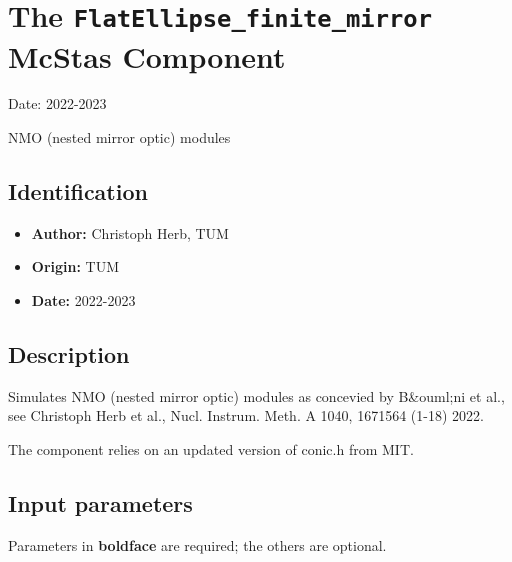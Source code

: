 \section{The \texttt{FlatEllipse\_finite\_mirror} McStas Component}
Date: 2022-2023

NMO (nested mirror optic) modules

\subsection*{Identification}
\begin{itemize}
  \item \textbf{Author:} Christoph Herb, TUM
  \item \textbf{Origin:} TUM
  \item \textbf{Date:} 2022-2023
\end{itemize}

\subsection*{Description}
Simulates NMO (nested mirror optic) modules as concevied by B\&ouml;ni et al., see Christoph Herb et al., Nucl. Instrum. Meth. A 1040, 1671564 (1-18) 2022.

The component relies on an updated version of conic.h from MIT.

\subsection*{Input parameters}
Parameters in \textbf{boldface} are required; the others are optional.

